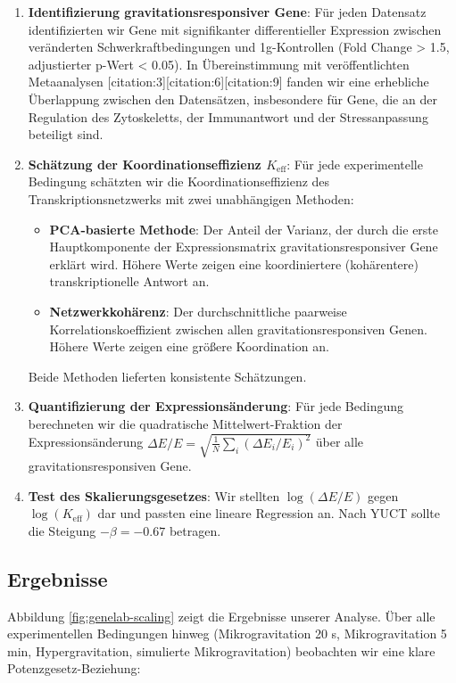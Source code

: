 \documentclass[12pt,a4paper]{article}
\theoremstyle{remark}
\newcommand{\Keff}{K_{\mathrm{eff}}}
\begin{document}
	\begin{enumerate}
		\item \textbf{Identifizierung gravitationsresponsiver Gene}: Für jeden Datensatz identifizierten wir Gene mit signifikanter differentieller Expression zwischen veränderten Schwerkraftbedingungen und 1g-Kontrollen (Fold Change > 1.5, adjustierter p-Wert < 0.05). In Übereinstimmung mit veröffentlichten Metaanalysen [citation:3][citation:6][citation:9] fanden wir eine erhebliche Überlappung zwischen den Datensätzen, insbesondere für Gene, die an der Regulation des Zytoskeletts, der Immunantwort und der Stressanpassung beteiligt sind.
		
		\item \textbf{Schätzung der Koordinationseffizienz \(\Keff\)}: Für jede experimentelle Bedingung schätzten wir die Koordinationseffizienz des Transkriptionsnetzwerks mit zwei unabhängigen Methoden:
		\begin{itemize}
			\item \textbf{PCA-basierte Methode}: Der Anteil der Varianz, der durch die erste Hauptkomponente der Expressionsmatrix gravitationsresponsiver Gene erklärt wird. Höhere Werte zeigen eine koordiniertere (kohärentere) transkriptionelle Antwort an.
			\item \textbf{Netzwerkkohärenz}: Der durchschnittliche paarweise Korrelationskoeffizient zwischen allen gravitationsresponsiven Genen. Höhere Werte zeigen eine größere Koordination an.
		\end{itemize}
		Beide Methoden lieferten konsistente Schätzungen.
		
		\item \textbf{Quantifizierung der Expressionsänderung}: Für jede Bedingung berechneten wir die quadratische Mittelwert-Fraktion der Expressionsänderung \(\Delta E/E = \sqrt{\frac{1}{N}\sum_i (\Delta E_i/E_i)^2}\) über alle gravitationsresponsiven Gene.
		
		\item \textbf{Test des Skalierungsgesetzes}: Wir stellten \(\log(\Delta E/E)\) gegen \(\log(\Keff)\) dar und passten eine lineare Regression an. Nach YUCT sollte die Steigung \(-\beta = -0.67\) betragen.
	\end{enumerate}
	
	\subsection{Ergebnisse}
	
	Abbildung \ref{fig:genelab-scaling} zeigt die Ergebnisse unserer Analyse. Über alle experimentellen Bedingungen hinweg (Mikrogravitation 20 s, Mikrogravitation 5 min, Hypergravitation, simulierte Mikrogravitation) beobachten wir eine klare Potenzgesetz-Beziehung:
	
\end{document}
